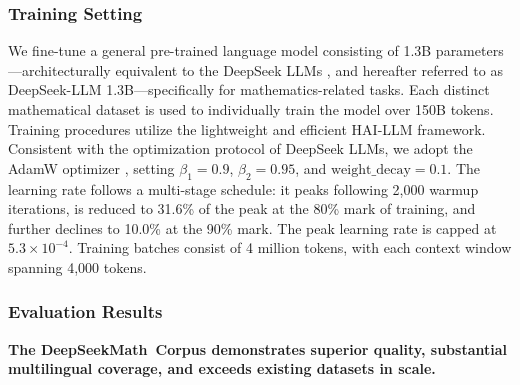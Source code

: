 \subsubsection{Training Setting}
\label{sec:quality-policy}
We fine-tune a general pre-trained language model consisting of 1.3B parameters—architecturally equivalent to the DeepSeek LLMs \citep{deepseek-llm}, and hereafter referred to as DeepSeek-LLM 1.3B—specifically for mathematics-related tasks. Each distinct mathematical dataset is used to individually train the model over 150B tokens. Training procedures utilize the lightweight and efficient HAI-LLM \citep{haillm} framework. Consistent with the optimization protocol of DeepSeek LLMs, we adopt the AdamW optimizer \citep{adamW}, setting $\beta_1=0.9$, $\beta_2=0.95$, and $\mathrm{weight\_decay}=0.1$. The learning rate follows a multi-stage schedule: it peaks following 2,000 warmup iterations, is reduced to 31.6\% of the peak at the 80\% mark of training, and further declines to 10.0\% at the 90\% mark. The peak learning rate is capped at $5.3\times 10^{-4}$. Training batches consist of 4 million tokens, with each context window spanning 4,000 tokens.

\subsubsection{Evaluation Results}

\textbf{The DeepSeekMath~Corpus demonstrates superior quality, substantial multilingual coverage, and exceeds existing datasets in scale.}

